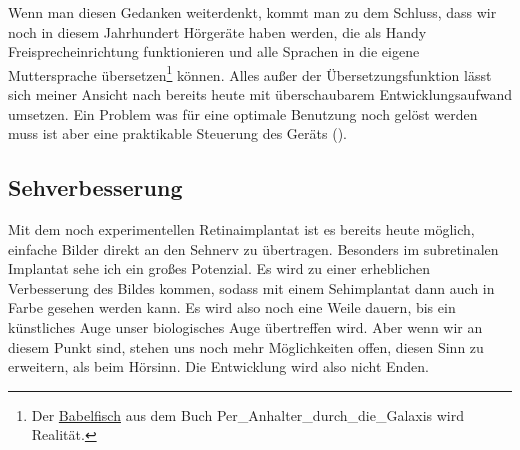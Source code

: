 Wenn man diesen Gedanken weiterdenkt, kommt man zu dem Schluss, dass wir noch in diesem Jahrhundert
Hörgeräte haben werden, die als Handy Freisprecheinrichtung funktionieren und alle
\label{sec:Robin:future:hearing:Babel_Fish}%
Sprachen in die
eigene Muttersprache übersetzen\footnote{Der
\href{http://de.wikipedia.org/wiki/Babelfisch}{Babelfisch} aus dem Buch \citetitle
{Per_Anhalter_durch_die_Galaxis} wird Realität.} können. Alles außer der Übersetzungsfunktion lässt
sich meiner Ansicht nach bereits
heute mit überschaubarem Entwicklungsaufwand umsetzen. Ein Problem was für eine optimale Benutzung
noch gelöst werden muss ist aber eine praktikable Steuerung des Geräts
().

\subsection{Sehverbesserung}
Mit dem noch experimentellen Retinaimplantat ist es bereits heute möglich, einfache Bilder direkt
an den Sehnerv zu übertragen. Besonders im subretinalen Implantat sehe ich ein großes Potenzial. Es
wird zu einer erheblichen Verbesserung des Bildes kommen, sodass mit einem Sehimplantat dann auch in
Farbe gesehen werden kann. Es wird also noch eine Weile dauern, bis ein künstliches Auge unser
biologisches Auge übertreffen wird. Aber wenn wir an diesem Punkt sind, stehen uns noch mehr
Möglichkeiten offen, diesen Sinn zu erweitern, als beim Hörsinn. Die Entwicklung wird also nicht
Enden.

